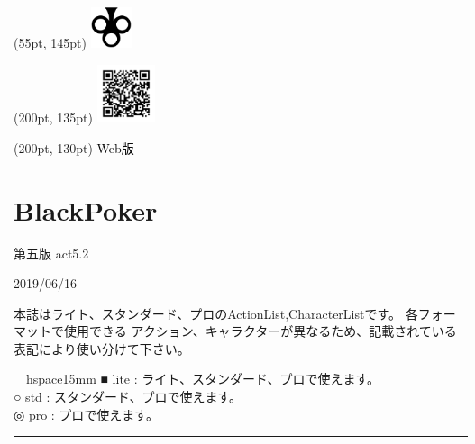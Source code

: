 \documentclass[twocolumn,a5paper,papersize,10pt]{jarticle}
\title{\empty}
\author{\empty}
\date{\empty}
\begin{document}
\begin{textblock*}{0.4\linewidth}(55pt, 145pt)
    \centering
    \includegraphics[width=1.2cm]{blackpoker_logo.pdf}
\end{textblock*}

\begin{textblock*}{0.4\linewidth}(200pt, 135pt)
    \centering
    \includegraphics[width=1.7cm,keepaspectratio]{qr_blackpoker-support_v5-pro.pdf}
\end{textblock*}
\begin{textblock*}{0.4\linewidth}(200pt, 130pt)
    \centering
    \textcolor{black}{Web版}
\end{textblock*}


\section*{\textrm{\Large BlackPoker}}
\vspace{-1zh}%
\noindent

\begin{center}
{\footnotesize 第五版 act5.2}

{\scriptsize 2019/06/16}
\end{center}

\scriptsize%
\renewcommand{\labelitemi}{・}%
{\quad}本誌はライト、スタンダード、プロのActionList,CharacterListです。
各フォーマットで使用できる
アクション、キャラクターが異なるため、記載されている表記により使い分けて下さい。
\vspace{-1zh}%
\begin{tabbing}
 \hspace{2mm} \= \hspace{2mm} \= \hspace{3mm} \= \hspace{1mm} \= hspace{15mm} \kill
\> ■ \>lite \> : \>ライト、スタンダード、プロで使えます。\\
\> ○ \>std \> : \>スタンダード、プロで使えます。\\
\> ◎ \>pro \> : \>プロで使えます。\\
\end{tabbing}
\vspace{-2zh}%
\hrule height 0.5mm depth 0mm width 66.5mm %
\vspace{-3zh}%
\end{document}
